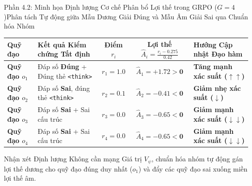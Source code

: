\begin{frame}{Phần 4.2: Minh họa Định lượng Cơ chế Phân bổ Lợi thế trong GRPO ($G = 4$)}{Phân tách Tự động giữa Mẫu Dương Giải Đúng và Mẫu Âm Giải Sai qua Chuẩn hóa Nhóm}
  \vspace{0.05cm}
  \footnotesize
  \renewcommand{\arraystretch}{1.25}
  \begin{tabularx}{\textwidth}{@{}l l c c X@{}}
    \toprule
    \textbf{Quỹ đạo} & \textbf{Kết quả Kiểm chứng Tất định} & \textbf{Điểm $r_i$} & \textbf{Lợi thế $\hat{A}_i = \frac{r_i - 0.275}{0.42}$} & \textbf{Hướng Cập nhật Đạo hàm} \\
    \midrule
    \textbf{Quỹ đạo $o_1$} & Đáp số \textbf{Đúng} + Đúng thẻ \texttt{<think>} & $r_1 = \mathbf{1.0}$ & $\hat{A}_1 = \mathbf{+1.72 > 0}$ & \textbf{\textcolor{tealgreen}{Tăng mạnh xác suất ($\uparrow\uparrow$)}} \\
    \hline
    \textbf{Quỹ đạo $o_2$} & Đáp số \textbf{Sai}, đúng thẻ \texttt{<think>} & $r_2 = \mathbf{0.1}$ & $\hat{A}_2 = \mathbf{-0.41 < 0}$ & \textbf{\textcolor{stanfordred}{Giảm nhẹ xác suất ($\downarrow$)}} \\
    \hline
    \textbf{Quỹ đạo $o_3$} & Đáp số \textbf{Sai} + Sai cấu trúc & $r_3 = \mathbf{0.0}$ & $\hat{A}_3 = \mathbf{-0.65 < 0}$ & \textbf{\textcolor{stanfordred}{Giảm mạnh xác suất ($\downarrow\downarrow$)}} \\
    \hline
    \textbf{Quỹ đạo $o_4$} & Đáp số \textbf{Sai} + Sai cấu trúc & $r_4 = \mathbf{0.0}$ & $\hat{A}_4 = \mathbf{-0.65 < 0}$ & \textbf{\textcolor{stanfordred}{Giảm mạnh xác suất ($\downarrow\downarrow$)}} \\
    \bottomrule
  \end{tabularx}

  \vspace{0.10cm}
  \begin{exampleblock}{Nhận xét Định lượng}
    \footnotesize
    Không cần mạng Giá trị $V_\psi$, chuẩn hóa nhóm tự động gán lợi thế dương cho quỹ đạo đúng duy nhất ($o_1$) và đẩy các quỹ đạo sai xuống miền lợi thế âm.
  \end{exampleblock}
\end{frame}

